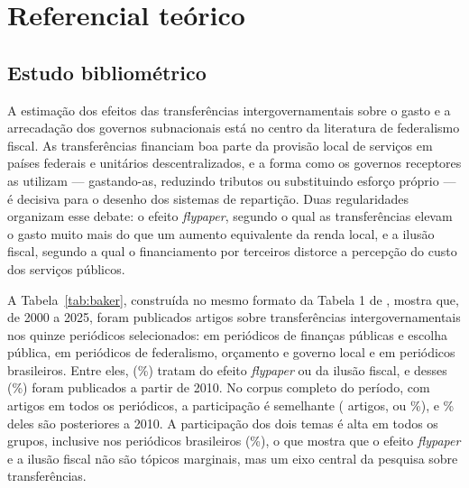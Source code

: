 \section{Referencial teórico}\label{sec:referencial}

\subsection{Estudo bibliométrico}\label{sec:biblio}

A estimação dos efeitos das transferências intergovernamentais sobre o gasto e a arrecadação dos governos subnacionais está no centro da literatura de federalismo fiscal. As transferências financiam boa parte da provisão local de serviços em países federais e unitários descentralizados, e a forma como os governos receptores as utilizam --- gastando-as, reduzindo tributos ou substituindo esforço próprio --- é decisiva para o desenho dos sistemas de repartição. Duas regularidades organizam esse debate: o efeito \textit{flypaper}, segundo o qual as transferências elevam o gasto muito mais do que um aumento equivalente da renda local, e a ilusão fiscal, segundo a qual o financiamento por terceiros distorce a percepção do custo dos serviços públicos.

A Tabela~\ref{tab:baker}, construída no mesmo formato da Tabela 1 de , mostra que, de 2000 a 2025, foram publicados \tUmTot{} artigos sobre transferências intergovernamentais nos quinze periódicos selecionados: \tUmFin{} em periódicos de finanças públicas e escolha pública, \tUmFed{} em periódicos de federalismo, orçamento e governo local e \tUmBr{} em periódicos brasileiros. Entre eles, \tUmFly{} (\tUmPct\%) tratam do efeito \textit{flypaper} ou da ilusão fiscal, e \tUmDezTot{} desses \tUmFly{} (\tUmDezPct\%) foram publicados a partir de 2010. No corpus completo do período, com \corpTot{} artigos em todos os periódicos, a participação é semelhante (\corpFly{} artigos, ou \corpPct\%), e \corpDezPct\% deles são posteriores a 2010. A participação dos dois temas é alta em todos os grupos, inclusive nos periódicos brasileiros (\tUmBrPct\%), o que mostra que o efeito \textit{flypaper} e a ilusão fiscal não são tópicos marginais, mas um eixo central da pesquisa sobre transferências.



